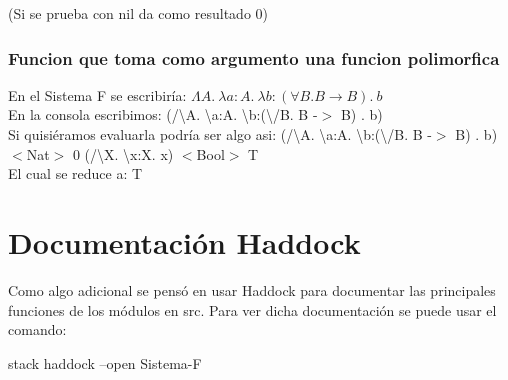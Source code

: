 \documentclass[12pt, titlepage, a4paper]{article}
\begin{document}
\noindent (Si se prueba con nil da como resultado 0)

\subsubsection{Funcion que toma como argumento una funcion polimorfica}
\noindent En el Sistema F se escribiría: $\Lambda A.\ \lambda a:A.\ \lambda b:(\forall B. B \rightarrow  B). \ b$ \\
En la consola escribimos: (/\textbackslash A. \textbackslash a:A. \textbackslash b:(\textbackslash /B. B -$>$ B) . b)\\
Si quisiéramos evaluarla podría ser algo asi: (/\textbackslash A. \textbackslash a:A. \textbackslash b:(\textbackslash /B. B -$>$ B) . b) $<$Nat$>$ 0 (/\textbackslash X. \textbackslash x:X. x) $<$Bool$>$ T\\
El cual se reduce a: T

\section{Documentación Haddock}
Como algo adicional se pensó en usar Haddock \cite{HaddockDoc} para documentar las principales funciones de los módulos en src.
Para ver dicha documentación se puede usar el comando:
\begin{center}
  stack haddock --open Sistema-F
\end{center}



\newpage



\end{document}
